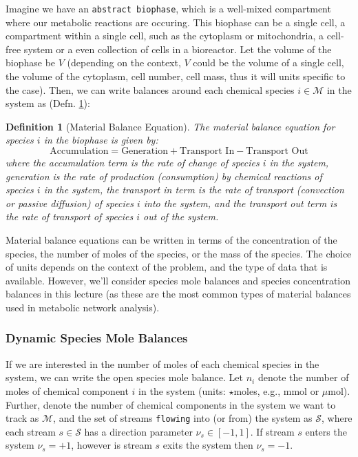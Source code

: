 \documentclass{article}[11pt]
\newtheorem{defn}{Definition}
\begin{document}
Imagine we have an \texttt{abstract biophase}, which is a well-mixed compartment where our metabolic reactions are occuring.
This biophase can be a single cell, a compartment within a single cell, such as the cytoplasm or mitochondria, a cell-free system or a even collection of cells in 
a bioreactor. Let the volume of the biophase be $V$ (depending on the context, $V$ could be the volume of a single cell, the volume of the cytoplasm, cell number, cell mass, thus it will units specific to the case).
Then, we can write balances around each chemical species $i\in\mathcal{M}$ in the system as (Defn. \ref{defn-material-balance}):

\begin{defn}[Material Balance Equation]\label{defn-material-balance}
The material balance equation for species $i$ in the biophase is given by:
\begin{equation}\label{eqn-material-balance-words}
\text{Accumulation} = \text{Generation} + \text{Transport In} - \text{Transport Out}
\end{equation}
where the accumulation term is the rate of change of species $i$ in the system, generation is the rate of production (consumption) by chemical reactions of species $i$ in the system,
the transport in term is the rate of transport (convection or passive diffusion) of species $i$ into the system, 
and the transport out term is the rate of transport of species $i$ out of the system.
\end{defn}

Material balance equations can be written in terms of the concentration of the species, the number of moles of the species, or the mass of the species.
The choice of units depends on the context of the problem, and the type of data that is available. 
However, we'll consider species mole balances and species concentration balances in this lecture (as these are the most common types of material balances used in metabolic network analysis).

\subsubsection*{Dynamic Species Mole Balances}
If we are interested in the number of moles of each chemical species in the system, we can write the open species mole balance.
Let $n_{i}$ denote the number of moles of chemical component $i$ in the system 
(units: $\star$moles, e.g., mmol or  $\mu$mol).
Further, denote the number of chemical components in the system we want to track as $\mathcal{M}$, and the set of
streams \texttt{flowing} into (or from) the system as $\mathcal{S}$, where each stream 
$s\in\mathcal{S}$ has a direction parameter $\nu_{s}\in\left[-1,1\right]$. 
If stream $s$ enters the system $\nu_{s} = +1$, however is stream $s$ exits the system then $\nu_{s} = -1$.
\end{document}

